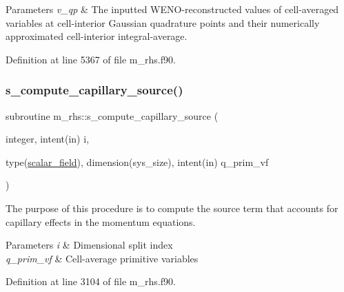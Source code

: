 \begin{DoxyParams}{Parameters}
{\em v\+\_\+qp} & The inputted W\+E\+N\+O-\/reconstructed values of cell-\/averaged variables at cell-\/interior Gaussian quadrature points and their numerically approximated cell-\/interior integral-\/average. \\
\hline
\end{DoxyParams}


Definition at line 5367 of file m\+\_\+rhs.\+f90.

\mbox{\label{namespacem__rhs_aca45586b8c966f8e3a5477444cf60dda}} 
\subsubsection{\texorpdfstring{s\+\_\+compute\+\_\+capillary\+\_\+source()}{s\_compute\_capillary\_source()}}
{\footnotesize\ttfamily subroutine m\+\_\+rhs\+::s\+\_\+compute\+\_\+capillary\+\_\+source (\begin{DoxyParamCaption}\item[{integer, intent(in)}]{i,  }\item[{type(\hyperlink{structm__derived__types_1_1scalar__field}{scalar\+\_\+field}), dimension(sys\+\_\+size), intent(in)}]{q\+\_\+prim\+\_\+vf }\end{DoxyParamCaption})}



The purpose of this procedure is to compute the source term that accounts for capillary effects in the momentum equations. 


\begin{DoxyParams}{Parameters}
{\em i} & Dimensional split index \\
\hline
{\em q\+\_\+prim\+\_\+vf} & Cell-\/average primitive variables \\
\hline
\end{DoxyParams}


Definition at line 3104 of file m\+\_\+rhs.\+f90.

\mbox{\label{namespacem__rhs_af771a6193fc6e856bcbfc269f096e3c9}} 
